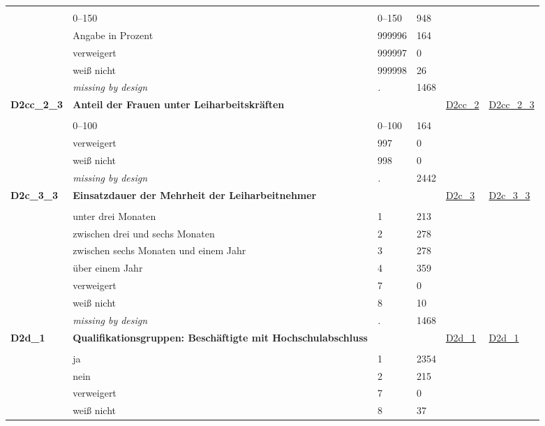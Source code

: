 \begin{longtable}{| L{2.45cm} | L{6cm} | C{1.5cm} | R{1cm} | C{2.25cm} | C{2.25cm} |}
   &  &  &  &  &  \\ 
   & 0--150 & 0--150 & 948 &  &  \\ 
   & Angabe in Prozent & 999996 & 164 &  &  \\ 
   & verweigert & 999997 & 0 &  &  \\ 
   & weiß nicht & 999998 & 26 &  &  \\ 
   & \textit{missing by design} & \textit{.} & 1468 &  &  \\ 
   \midrule
\textbf{D2cc\_2\_3}\label{var:D2cc:2:3} & \textbf{Anteil der Frauen unter Leiharbeitskräften} &  &  & \hyperref[D2cc:2]{D2cc\_2} & \hyperref[var:suf:D2cc:2:3]{D2cc\_2\_3} \\ 
   &  &  &  &  &  \\ 
   & 0--100 & 0--100 & 164 &  &  \\ 
   & verweigert & 997 & 0 &  &  \\ 
   & weiß nicht & 998 & 0 &  &  \\ 
   & \textit{missing by design} & \textit{.} & 2442 &  &  \\ 
   \midrule
\textbf{D2c\_3\_3}\label{var:D2c:3:3} & \textbf{Einsatzdauer der Mehrheit der Leiharbeitnehmer} &  &  & \hyperref[D2c:3]{D2c\_3} & \hyperref[var:suf:D2c:3:3]{D2c\_3\_3} \\ 
   &  &  &  &  &  \\ 
   & unter drei Monaten & 1 & 213 &  &  \\ 
   & zwischen drei und sechs Monaten & 2 & 278 &  &  \\ 
   & zwischen sechs Monaten und einem Jahr & 3 & 278 &  &  \\ 
   & über einem Jahr & 4 & 359 &  &  \\ 
   & verweigert & 7 & 0 &  &  \\ 
   & weiß nicht & 8 & 10 &  &  \\ 
   & \textit{missing by design} & \textit{.} & 1468 &  &  \\ 
   \midrule
\textbf{D2d\_1}\label{var:D2d:1} & \textbf{Qualifikationsgruppen: Beschäftigte mit Hochschulabschluss} &  &  & \hyperref[D2d:1]{D2d\_1} & \hyperref[var:suf:D2d:1]{D2d\_1} \\ 
   &  &  &  &  &  \\ 
   & ja & 1 & 2354 &  &  \\ 
   & nein & 2 & 215 &  &  \\ 
   & verweigert & 7 & 0 &  &  \\ 
   & weiß nicht & 8 & 37 &  &  \\ 

\end{longtable}

